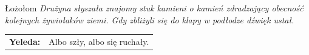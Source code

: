 \documentclass[10pt,twoside,twocolumn]{book}
\begin{document}
\begin{rpg-quotebox}{Łożołom}
   \textit{Drużyna słyszała znajomy stuk kamieni o kamień zdradzający obecność kolejnych żywiołaków ziemi. Gdy zbliżyli się do klapy w podłodze dźwięk ustał.}\\

   \begin{tabularx}{\columnwidth}{lX}
      \textbf{Yeleda:} & Albo szły, albo się ruchały.\\
   \end{tabularx}
\end{rpg-quotebox}

% 
% 
% 
% 
% 
\end{document}
